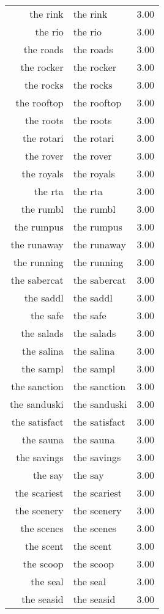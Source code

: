 \begin{table}[ht]
\begin{tabular}{rlr}
  the rink & the rink & 3.00 \\ 
  the rio & the rio & 3.00 \\ 
  the roads & the roads & 3.00 \\ 
  the rocker & the rocker & 3.00 \\ 
  the rocks & the rocks & 3.00 \\ 
  the rooftop & the rooftop & 3.00 \\ 
  the roots & the roots & 3.00 \\ 
  the rotari & the rotari & 3.00 \\ 
  the rover & the rover & 3.00 \\ 
  the royals & the royals & 3.00 \\ 
  the rta & the rta & 3.00 \\ 
  the rumbl & the rumbl & 3.00 \\ 
  the rumpus & the rumpus & 3.00 \\ 
  the runaway & the runaway & 3.00 \\ 
  the running & the running & 3.00 \\ 
  the sabercat & the sabercat & 3.00 \\ 
  the saddl & the saddl & 3.00 \\ 
  the safe & the safe & 3.00 \\ 
  the salads & the salads & 3.00 \\ 
  the salina & the salina & 3.00 \\ 
  the sampl & the sampl & 3.00 \\ 
  the sanction & the sanction & 3.00 \\ 
  the sanduski & the sanduski & 3.00 \\ 
  the satisfact & the satisfact & 3.00 \\ 
  the sauna & the sauna & 3.00 \\ 
  the savings & the savings & 3.00 \\ 
  the say & the say & 3.00 \\ 
  the scariest & the scariest & 3.00 \\ 
  the scenery & the scenery & 3.00 \\ 
  the scenes & the scenes & 3.00 \\ 
  the scent & the scent & 3.00 \\ 
  the scoop & the scoop & 3.00 \\ 
  the seal & the seal & 3.00 \\ 
  the seasid & the seasid & 3.00 \\ 

\end{tabular}
\end{table}
